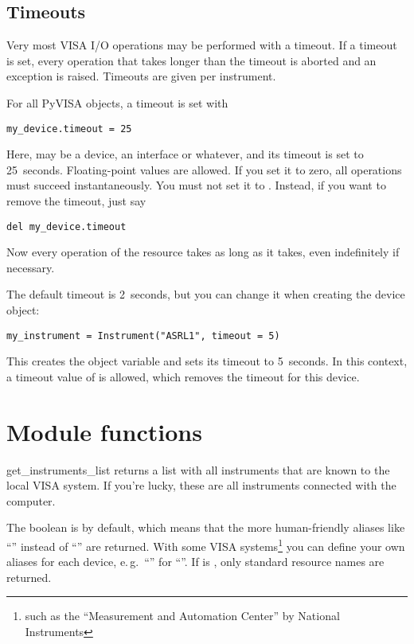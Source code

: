 \documentclass{howto}
\begin{document}
\subsection{Timeouts}
\label{sec:timeouts}

Very most VISA I/O operations may be performed with a timeout.  If a timeout is
set, every operation that takes longer than the timeout is aborted and an
exception is raised.  Timeouts are given per instrument.

For all PyVISA objects, a timeout is set with
\begin{verbatim}
my_device.timeout = 25
\end{verbatim}
Here,  may be a device, an interface or whatever, and its
timeout is set to 25~seconds.  Floating-point values are allowed.  If you set
it to zero, all operations must succeed instantaneously.  You must not set it
to .  Instead, if you want to remove the timeout, just say
\begin{verbatim}
del my_device.timeout
\end{verbatim}
Now every operation of the resource takes as long as it takes, even
indefinitely if necessary.

The default timeout is 2~seconds, but you can change it when creating the
device object:
\begin{verbatim}
my_instrument = Instrument("ASRL1", timeout = 5)
\end{verbatim}
This creates the object variable  and sets its timeout to
5~seconds.  In this context, a timeout value of  is allowed, which
removes the timeout for this device.

\section{Module functions}

\begin{funcdesc}{get_instruments_list}{}
  returns a list with all instruments that are known to the local VISA system.
  If you're lucky, these are all instruments connected with the computer.

  The boolean  is  by default, which means that the
  more human-friendly aliases like ``'' instead of ``''
  are returned.  With some VISA systems\footnote{such as the ``Measurement and
    Automation Center'' by National Instruments} you can define your own
  aliases for each device, e.\,g.\ ``'' for
  ``''.  If  is , only
  standard resource names are returned.
\end{funcdesc}
\end{document}
